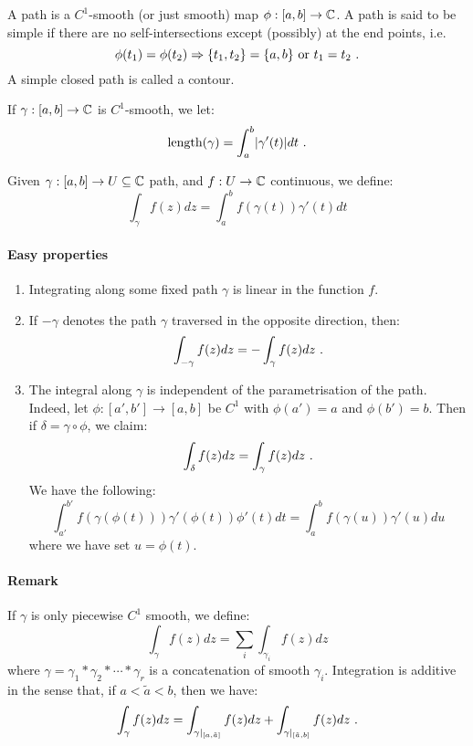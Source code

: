 \begin{definition}
  A path is a $C^1$-smooth (or just smooth) map $\phi : [a, b] \rightarrow \mathbb{C}$. A path is said to be simple if there are no self-intersections except (possibly) at the end points, i.e.
\[
\phi(t_1) = \phi(t_2) \Rightarrow \{t_1, t_2\} = \{a, b\} \text{ or } t_1 = t_2 \ \text{.}
\]
A simple closed path is called a contour.
\end{definition}

If $\gamma : [a, b] \rightarrow \mathbb{C}$ is $C^1$-smooth, we let:
\[
\text{length}(\gamma) = \int_a^b \abs*{\gamma'(t)} dt\mpunct{.}
\]

\begin{definition}
  Given $\gamma : [a, b] \rightarrow U \subseteq \mathbb{C}$  path, and $f : U \rightarrow \mathbb{C}$ continuous, we define:
\[
\int_\gamma f(z) dz = \int_a^b f\left(\gamma(t)\right)\gamma'(t) dt
\]
\end{definition}

\paragraph{Easy properties}

\begin{enumerate}
\item Integrating along some fixed path $\gamma$ is linear in the function $f$.
\item If $-\gamma$ denotes the path $\gamma$ traversed in the opposite direction, then:
\[
\int_{-\gamma} f(z)dz = -\int_\gamma f(z) dz \ \text{.}
\]

\item The integral along $\gamma$ is independent of the parametrisation of the path.
Indeed, let $\phi : [a', b'] \rightarrow [a, b]$ be $C^1$ with $\phi(a') = a$ and $\phi(b') = b$.
Then if $\delta = \gamma \circ \phi$, we claim:
\[
\int_\delta f(z) dz = \int_\gamma f(z) dz \ \text{.}
\]
We have the following:
\[
  \int_{a'}^{b'} f(\gamma(\phi(t)))\gamma'(\phi(t))\phi'(t) dt = \int_a^b f(\gamma(u))\gamma'(u) du
\]
where we have set $u = \phi(t)$.
\end{enumerate}

\paragraph{Remark}

If $\gamma$ is only piecewise $C^1$ smooth, we define:
\[
\int_\gamma f(z)dz = \sum_i \int_{\gamma_i} f(z)dz
\]
where $\gamma = \gamma_1 * \gamma_2 * \dotsb * \gamma_r$ is a concatenation of smooth $\gamma_i$.
Integration is additive in the sense that, if $a < \tilde{a} < b$, then we have:
\[
\int_\gamma f(z)dz = \int_{\gamma\rvert_{[a, \tilde{a}]}} f(z)dz + \int_{\gamma\rvert_{[\tilde{a}, b]}} f(z) dz \ \text{.}
\]

